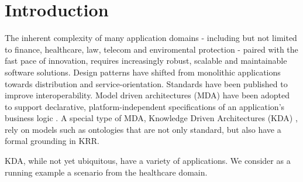 \documentclass[runningheads]{llncs}
\begin{document}
\vspace{-0.8cm}
\section{Introduction}
The inherent complexity of many application domains \-- including but not limited to finance, healthcare, law, telecom and enviromental protection \-- paired with the fast pace of innovation, requires increasingly robust, scalable and maintainable software solutions. Design patterns have shifted from monolithic applications towards distribution and service-orientation. Standards have been published to improve interoperability. Model driven architectures (MDA) have been adopted to support declarative, platform-independent specifications of an application's business logic \cite{Mellor:2004:MD:983969}. A special type of MDA, Knowledge Driven Architectures (KDA) \cite{Rector:2010}, rely on models such as ontologies that are not only standard, but also have a formal grounding in KRR. 


KDA, while not yet ubiquitous, have a variety of applications. We consider as a running example a scenario from the healthcare domain.
\end{document}

